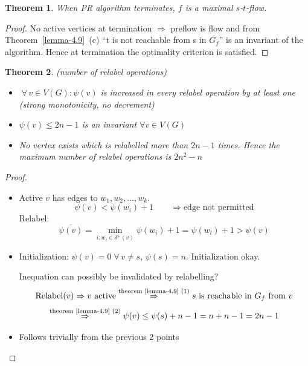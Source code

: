 \documentclass{article}
\newtheorem{theorem}{Theorem}
\newcommand{\flow}[2]{$#1$-$#2$-flow}
\newcommand{\fall}{\;\forall\,}
\begin{document}
\begin{theorem}\label{satz-4.10}
  When PR algorithm terminates, $f$ is a maximal \flow st.
\end{theorem}

\begin{proof}
  No active vertices at termination $\Rightarrow$ preflow is flow and from Theorem~\ref{lemma-4.9}~(c) ``t is not reachable from s in $G_f$'' is an invariant of the algorithm. Hence at termination the optimality criterion is satisfied.
\end{proof}

\begin{theorem}\label{lemma-4.11}
  (number of relabel operations)
  \begin{itemize}
    \item $\fall v \in V(G): \psi(v)$ is increased in every relabel operation by at least one (strong monotonicity, no decrement)
    \item $\psi(v) \leq 2n - 1$ is an invariant $\forall v \in V(G)$
    \item No vertex exists which is relabelled more than $2n - 1$ times. Hence the maximum number of relabel operations is $2n^2 - n$
  \end{itemize}
\end{theorem}

\begin{proof}
  \begin{itemize}
    \item Active $v$ has edges to $w_1, w_2, \ldots, w_k$. 
      \[ \psi(v) < \psi(w_i) + 1 \qquad \Rightarrow \text{edge not permitted} \]
      Relabel:
      \[ \overline{\psi(v)} = \min_{i: w_i \in \delta^+(v)} \psi(w_i) + 1 = \psi(w_l) + 1 > \psi(v) \]
    \item Initialization: $\psi(v) = 0 \fall v \neq s$, $\psi(s) = n$. Initialization okay.

      Inequation can possibly be invalidated by relabelling?
      \[
        \operatorname{Relabel}(v)
          \Rightarrow v \text{ active}
          \stackrel{\text{theorem~\ref{lemma-4.9} (1)}}{\Rightarrow} s \text{ is reachable in $G_f$ from } v
      \] \[
        \stackrel{\text{theorem~\ref{lemma-4.9} (2)}}{\Rightarrow}
          \psi(v) \leq \psi(s) + n - 1
          = n + n - 1 = 2n - 1
      \]
    \item Follows trivially from the previous 2 points
  \end{itemize}
\end{proof}
\end{document}
